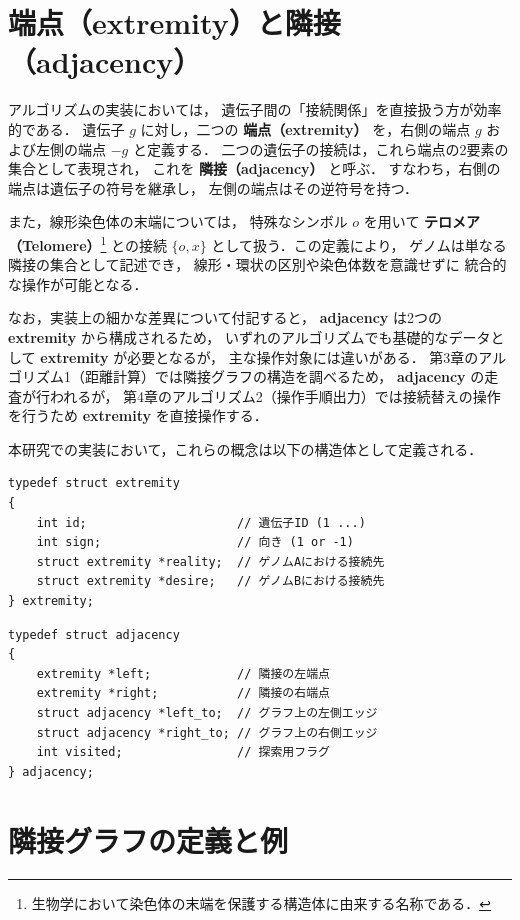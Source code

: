 \documentclass[paper=a4,fontsize=11pt,report,oneside]{jlreq}
\begin{document}
\section{端点（extremity）と隣接（adjacency）}

アルゴリズムの実装においては，
遺伝子間の「接続関係」を直接扱う方が効率的である．
遺伝子 $g$ に対し，二つの \textbf{端点（extremity）}
 を，右側の端点 $g$ および左側の端点 $-g$ と定義する．
 二つの遺伝子の接続は，これら端点の2要素の集合として表現され，
 これを \textbf{隣接（adjacency）} と呼ぶ．
すなわち，右側の端点は遺伝子の符号を継承し，
左側の端点はその逆符号を持つ．

また，線形染色体の末端については，
特殊なシンボル $o$ を用いて
\textbf{テロメア（Telomere）}\footnote{生物学において染色体の末端を保護する構造体に由来する名称である．}
との接続 $\{o, x\}$ として扱う．この定義により，
ゲノムは単なる隣接の集合として記述でき，
線形・環状の区別や染色体数を意識せずに
統合的な操作が可能となる．

なお，実装上の細かな差異について付記すると，
\textbf{adjacency} は2つの \textbf{extremity}
から構成されるため，
いずれのアルゴリズムでも基礎的なデータとして
\textbf{extremity} が必要となるが，
主な操作対象には違いがある．
第3章のアルゴリズム1（距離計算）では隣接グラフの構造を調べるため，
\textbf{adjacency} の走査が行われるが，
第4章のアルゴリズム2（操作手順出力）では接続替えの操作を行うため
\textbf{extremity} を直接操作する．

本研究での実装において，これらの概念は以下の構造体として定義される．

\begin{lstlisting}[caption=extremity 構造体の定義, label=code:extremity]
typedef struct extremity
{
    int id;                     // 遺伝子ID (1 ...)
    int sign;                   // 向き (1 or -1)
    struct extremity *reality;  // ゲノムAにおける接続先
    struct extremity *desire;   // ゲノムBにおける接続先
} extremity;
\end{lstlisting}

\begin{lstlisting}[caption=adjacency 構造体の定義, label=code:adjacency]
typedef struct adjacency
{
    extremity *left;            // 隣接の左端点
    extremity *right;           // 隣接の右端点
    struct adjacency *left_to;  // グラフ上の左側エッジ
    struct adjacency *right_to; // グラフ上の右側エッジ
    int visited;                // 探索用フラグ
} adjacency;
\end{lstlisting}

\section{隣接グラフの定義と例}
\end{document}
